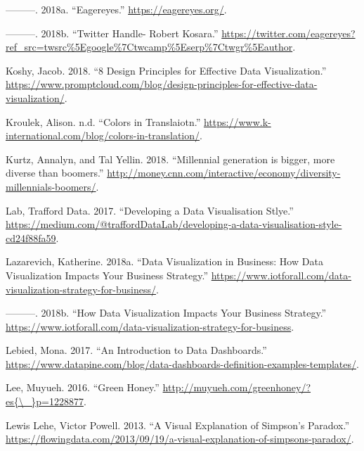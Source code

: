 \documentclass[]{book}
\begin{document}
\leavevmode\hypertarget{ref-eagereyes_viz}{}%
---------. 2018a. ``Eagereyes.'' \url{https://eagereyes.org/}.

\leavevmode\hypertarget{ref-twitter_Kosara}{}%
---------. 2018b. ``Twitter Handle- Robert Kosara.'' \url{https://twitter.com/eagereyes?ref_src=twsrc\%5Egoogle\%7Ctwcamp\%5Eserp\%7Ctwgr\%5Eauthor}.

\leavevmode\hypertarget{ref-promptcloud_2018}{}%
Koshy, Jacob. 2018. ``8 Design Principles for Effective Data Visualization.'' \url{https://www.promptcloud.com/blog/design-principles-for-effective-data-visualization/}.

\leavevmode\hypertarget{ref-Colors-in-Translation}{}%
Kroulek, Alison. n.d. ``Colors in Translaiotn.'' \url{https://www.k-international.com/blog/colors-in-translation/}.

\leavevmode\hypertarget{ref-age_groups}{}%
Kurtz, Annalyn, and Tal Yellin. 2018. ``Millennial generation is bigger, more diverse than boomers.'' \url{http://money.cnn.com/interactive/economy/diversity-millennials-boomers/}.

\leavevmode\hypertarget{ref-Trafford}{}%
Lab, Trafford Data. 2017. ``Developing a Data Visualisation Stlye.'' \url{https://medium.com/@traffordDataLab/developing-a-data-visualisation-style-cd24f88fa59}.

\leavevmode\hypertarget{ref-strategy_impact}{}%
Lazarevich, Katherine. 2018a. ``Data Visualization in Business: How Data Visualization Impacts Your Business Strategy.'' \url{https://www.iotforall.com/data-visualization-strategy-for-business/}.

\leavevmode\hypertarget{ref-biz_strategy}{}%
---------. 2018b. ``How Data Visualization Impacts Your Business Strategy.'' \url{https://www.iotforall.com/data-visualization-strategy-for-business}.

\leavevmode\hypertarget{ref-Dashboards}{}%
Lebied, Mona. 2017. ``An Introduction to Data Dashboards.'' \url{https://www.datapine.com/blog/data-dashboards-definition-examples-templates/}.

\leavevmode\hypertarget{ref-green_honey}{}%
Lee, Muyueh. 2016. ``Green Honey.'' \href{http://muyueh.com/greenhoney/?es\%7B/_\%7Dp=1228877}{http://muyueh.com/greenhoney/?es\{\textbackslash{}\_\}p=1228877}.

\leavevmode\hypertarget{ref-simpson_paradox}{}%
Lewis Lehe, Victor Powell. 2013. ``A Visual Explanation of Simpson's Paradox.'' \url{https://flowingdata.com/2013/09/19/a-visual-explanation-of-simpsons-paradox/}.
\end{document}
